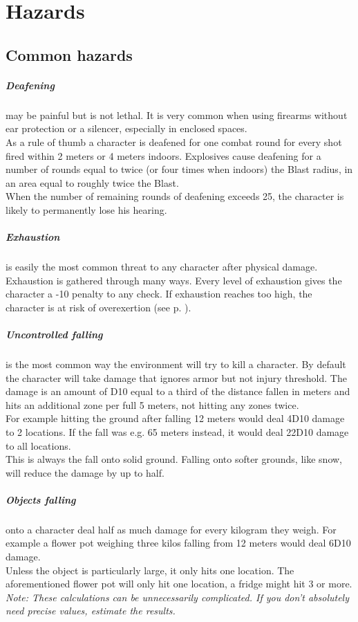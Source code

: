 \documentclass[12pt,a4paper,openany,usenames,dvipsnames]{book}
\begin{document}
	\chapter{Hazards}
	\section{Common hazards}
	\paragraph{Deafening} may be painful but is not lethal. It is very common when using firearms without ear protection or a silencer, especially in enclosed spaces.\\
	As a rule of thumb a character is deafened for one combat round for every shot fired within 2 meters or 4 meters indoors. Explosives cause deafening for a number of rounds equal to twice (or four times when indoors) the Blast radius, in an area equal to roughly twice the Blast.\\
	When the number of remaining rounds of deafening exceeds 25, the character is likely to permanently lose his hearing.
	\paragraph{Exhaustion} is easily the most common threat to any character after physical damage. Exhaustion is gathered through many ways. Every level of exhaustion gives the character a -10 penalty to any check. If exhaustion reaches too high, the character is at risk of overexertion (see p. \pageref{sec:lethality}).
	\paragraph{Uncontrolled falling} is the most common way the environment will try to kill a character. By default the character will take damage that ignores armor but not injury threshold. The damage is an amount of D10 equal to a third of the distance fallen in meters and hits an additional zone per full 5 meters, not hitting any zones twice.\\
	For example hitting the ground after falling 12 meters would deal 4D10 damage to 2 locations. If the fall was e.g. 65 meters instead, it would deal 22D10 damage to all locations.\\
	This is always the fall onto solid ground. Falling onto softer grounds, like snow, will reduce the damage by up to half.
	\paragraph{Objects falling} onto a character deal half as much damage for every kilogram they weigh. For example a flower pot weighing three kilos falling from 12 meters would deal 6D10 damage.\\
	Unless the object is particularly large, it only hits one location. The aforementioned flower pot will only hit one location, a fridge might hit 3 or more.\\
	\emph{Note: These calculations can be unnecessarily complicated. If you don't absolutely need precise values, estimate the results.}
	\label{hazards:suffocation}
\end{document}
